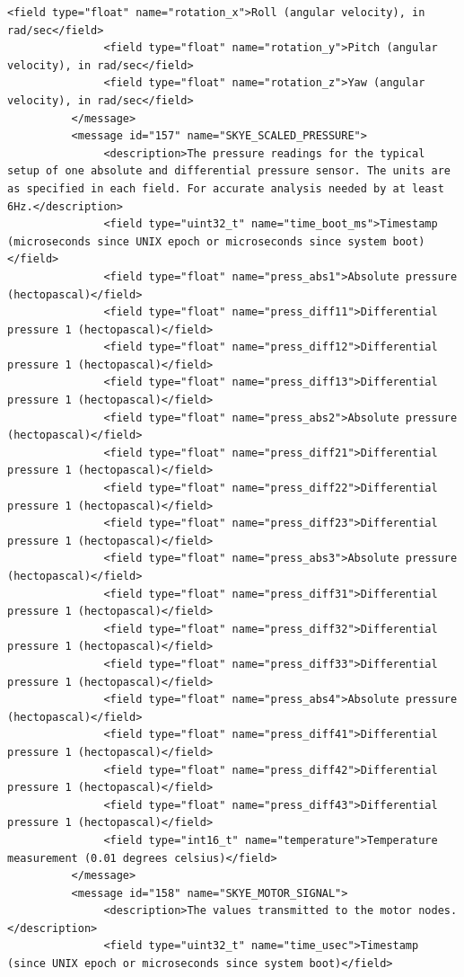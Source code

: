 \begin{lstlisting}[captionpos=b, caption="Definition of \textsc{Skye} specific Mavlink messages", label=app_xml]
               <field type="float" name="rotation_x">Roll (angular velocity), in rad/sec</field>
               <field type="float" name="rotation_y">Pitch (angular velocity), in rad/sec</field>
               <field type="float" name="rotation_z">Yaw (angular velocity), in rad/sec</field>
          </message>
          <message id="157" name="SKYE_SCALED_PRESSURE">
               <description>The pressure readings for the typical setup of one absolute and differential pressure sensor. The units are as specified in each field. For accurate analysis needed by at least 6Hz.</description>
               <field type="uint32_t" name="time_boot_ms">Timestamp (microseconds since UNIX epoch or microseconds since system boot)</field>
               <field type="float" name="press_abs1">Absolute pressure (hectopascal)</field>
               <field type="float" name="press_diff11">Differential pressure 1 (hectopascal)</field>
               <field type="float" name="press_diff12">Differential pressure 1 (hectopascal)</field>
               <field type="float" name="press_diff13">Differential pressure 1 (hectopascal)</field>
               <field type="float" name="press_abs2">Absolute pressure (hectopascal)</field>
               <field type="float" name="press_diff21">Differential pressure 1 (hectopascal)</field>
               <field type="float" name="press_diff22">Differential pressure 1 (hectopascal)</field>
               <field type="float" name="press_diff23">Differential pressure 1 (hectopascal)</field>
               <field type="float" name="press_abs3">Absolute pressure (hectopascal)</field>
               <field type="float" name="press_diff31">Differential pressure 1 (hectopascal)</field>
               <field type="float" name="press_diff32">Differential pressure 1 (hectopascal)</field>
               <field type="float" name="press_diff33">Differential pressure 1 (hectopascal)</field>
               <field type="float" name="press_abs4">Absolute pressure (hectopascal)</field>
               <field type="float" name="press_diff41">Differential pressure 1 (hectopascal)</field>
               <field type="float" name="press_diff42">Differential pressure 1 (hectopascal)</field>
               <field type="float" name="press_diff43">Differential pressure 1 (hectopascal)</field>
               <field type="int16_t" name="temperature">Temperature measurement (0.01 degrees celsius)</field>
          </message>
          <message id="158" name="SKYE_MOTOR_SIGNAL">
               <description>The values transmitted to the motor nodes.</description>
               <field type="uint32_t" name="time_usec">Timestamp (since UNIX epoch or microseconds since system boot)</field>

\end{lstlisting}

